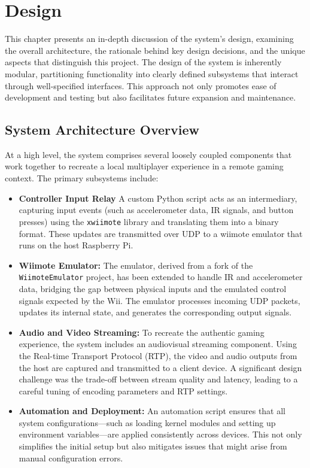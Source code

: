 \chapter{Design}
\label{chapter:design}

This chapter presents an in-depth discussion of the system's design, examining the overall architecture, the rationale behind key design decisions, and the unique aspects that distinguish this project. The design of the system is inherently modular, partitioning functionality into clearly defined subsystems that interact through well-specified interfaces. This approach not only promotes ease of development and testing but also facilitates future expansion and maintenance.

\section{System Architecture Overview}

At a high level, the system comprises several loosely coupled components that work together to recreate a local multiplayer experience in a remote gaming context. The primary subsystems include:

\begin{itemize}
    \item \textbf{Controller Input Relay}
          A custom Python script acts as an intermediary, capturing input events (such as accelerometer data, IR signals, and button presses) using the \texttt{xwiimote} library\cite{xwiimote} and translating them into a binary format. These updates are transmitted over UDP to a wiimote emulator that runs on the host Raspberry Pi.

\item \textbf{Wiimote Emulator:}
The emulator, derived from a fork\cite{jr_wiimote_emu} of the \texttt{WiimoteEmulator} project\cite{wiimote_emulator}, has been extended to handle IR and accelerometer data, bridging the gap between physical inputs and the emulated control signals expected by the Wii. The emulator processes incoming UDP packets, updates its internal state, and generates the corresponding output signals.

    \item \textbf{Audio and Video Streaming:}
          To recreate the authentic gaming experience, the system includes an audiovisual streaming component. Using the Real-time Transport Protocol (RTP), the video and audio outputs from the host are captured and transmitted to a client device. A significant design challenge was the trade-off between stream quality and latency, leading to a careful tuning of encoding parameters and RTP settings.

    \item \textbf{Automation and Deployment:}
          An automation script ensures that all system configurations—such as loading kernel modules and setting up environment variables—are applied consistently across devices. This not only simplifies the initial setup but also mitigates issues that might arise from manual configuration errors.
\end{itemize}

